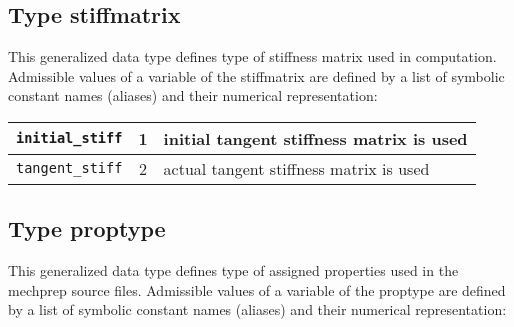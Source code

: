 \subsection{Type {\sf stiffmatrix}}
\label{sectstiffmatrix}

This generalized data type defines type of stiffness matrix used in computation.
Admissible values of a variable of the {\sf stiffmatrix} are defined by a list of symbolic constant names (aliases)
and their numerical representation:

\begin{center}
\begin{tabular}{|l|c|l|}
\hline
{\tt initial\_stiff} & 1 & initial tangent stiffness matrix is used \index{matrix!stiffness!initial}
\\ \hline
{\tt tangent\_stiff} & 2 & actual tangent stiffness matrix is used \index{matrix!stiffness!tangent}
\\ \hline
\end{tabular}
\end{center}

\subsection{Type {\sf proptype}}
\label{sectproptype}

This generalized data type defines type of assigned properties used in the mechprep source files.
Admissible values of a variable of the {\sf proptype} are defined by a list of symbolic constant names (aliases)
and their numerical representation:


